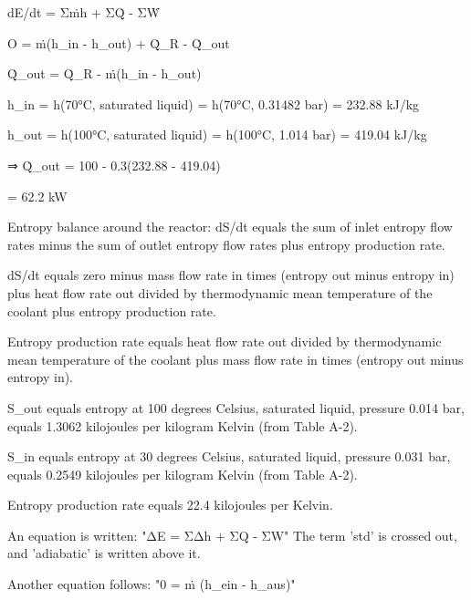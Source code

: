 dE/dt = Σṁh + ΣQ̇ - ΣẆ  

O = ṁ(h_in - h_out) + Q̇_R - Q̇_out  

Q̇_out = Q̇_R - ṁ(h_in - h_out)  

h_in = h(70°C, saturated liquid) = h(70°C, 0.31482 bar) = 232.88 kJ/kg  

h_out = h(100°C, saturated liquid) = h(100°C, 1.014 bar) = 419.04 kJ/kg  

⇒ Q̇_out = 100 - 0.3(232.88 - 419.04)  

= 62.2 kW

Entropy balance around the reactor:  
dS/dt equals the sum of inlet entropy flow rates minus the sum of outlet entropy flow rates plus entropy production rate.  

dS/dt equals zero minus mass flow rate in times (entropy out minus entropy in) plus heat flow rate out divided by thermodynamic mean temperature of the coolant plus entropy production rate.  

Entropy production rate equals heat flow rate out divided by thermodynamic mean temperature of the coolant plus mass flow rate in times (entropy out minus entropy in).  

S_out equals entropy at 100 degrees Celsius, saturated liquid, pressure 0.014 bar, equals 1.3062 kilojoules per kilogram Kelvin (from Table A-2).  

S_in equals entropy at 30 degrees Celsius, saturated liquid, pressure 0.031 bar, equals 0.2549 kilojoules per kilogram Kelvin (from Table A-2).  

Entropy production rate equals 22.4 kilojoules per Kelvin.

An equation is written:  
"ΔE = ΣΔh + ΣQ - ΣW"  
The term 'std' is crossed out, and 'adiabatic' is written above it.  

Another equation follows:  
"0 = ṁ (h_ein - h_aus)"